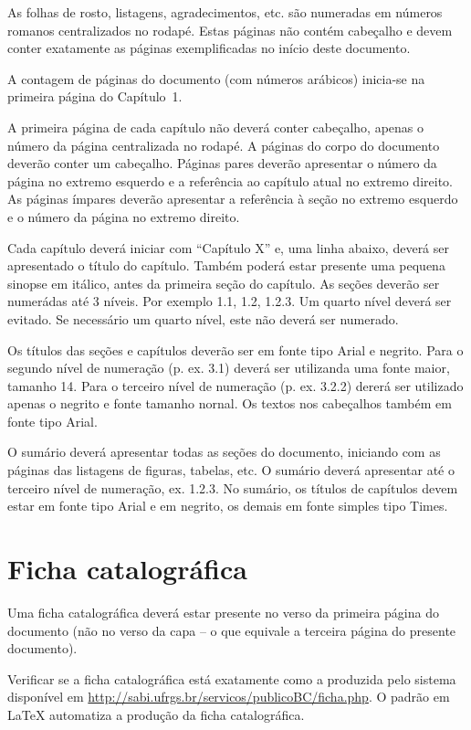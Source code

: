 As folhas de rosto, listagens, agradecimentos, etc. são numeradas em números romanos
centralizados no rodapé. Estas páginas não contém cabeçalho e devem
conter exatamente as páginas exemplificadas no início deste documento.

A contagem de páginas do documento (com números arábicos) inicia-se na primeira página do Capítulo~1.

A primeira página de cada capítulo não deverá conter cabeçalho, apenas o número da página
centralizada no rodapé.
A páginas do corpo do documento deverão conter um cabeçalho.
Páginas pares deverão apresentar o número da página no extremo esquerdo e a referência ao
capítulo atual no extremo direito.
As páginas ímpares deverão apresentar a referência à seção no extremo esquerdo e o número
da página no extremo direito.

Cada capítulo deverá iniciar com ``Capítulo X'' e, uma linha abaixo, deverá
ser apresentado o título do capítulo.
Também poderá estar presente uma pequena sinopse
em itálico, antes da primeira seção do capítulo.
As seções deverão ser numerádas até 3 níveis. Por exemplo 1.1, 1.2, 1.2.3.
Um quarto nível deverá ser evitado.
Se necessário um quarto nível, este não deverá ser numerado.

Os títulos das seções e capítulos deverão ser em fonte tipo Arial e negrito.
Para o segundo nível de numeração (p. ex. 3.1) deverá ser utilizanda uma fonte maior, tamanho 14.
Para o terceiro nível de numeração (p. ex. 3.2.2) dererá ser utilizado apenas o negrito e
fonte tamanho nornal.
Os textos nos cabeçalhos também em fonte tipo Arial.

O sumário deverá apresentar todas as seções do documento, iniciando com as páginas
das listagens de figuras, tabelas, etc.
O sumário deverá apresentar até o terceiro nível de numeração, ex. 1.2.3.
No sumário, os títulos de capítulos devem estar em fonte tipo Arial e em negrito,
os demais em fonte simples tipo Times.

\section{Ficha catalográfica}

Uma ficha catalográfica deverá estar presente no verso da primeira página do
documento (não no verso da capa -- o que equivale a terceira página do
presente documento).

Verificar se a ficha catalográfica está exatamente como a produzida
pelo sistema disponível em \url{http://sabi.ufrgs.br/servicos/publicoBC/ficha.php}.
O padrão em \LaTeX{} automatiza a produção da ficha catalográfica.

